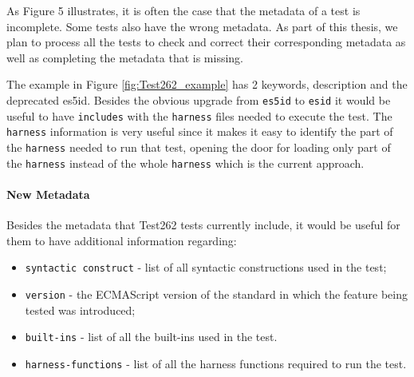\documentclass[runningheads]{llncs}
\begin{document}
As Figure 5 illustrates, it is often the case that the metadata of a test is incomplete. Some tests also have the wrong metadata. As part of this thesis, we plan to process all the tests to check and correct their corresponding metadata as well as completing the metadata that is missing.


The example in Figure \ref{fig:Test262_example} has 2 keywords, description and the deprecated es5id. Besides the obvious upgrade from \texttt{es5id} to \texttt{esid} it would be useful to have \texttt{includes} with the \texttt{harness} files needed to execute the test. The \texttt{harness} information is very useful since it makes it easy to identify the part of the \texttt{harness} needed to run that test, opening the door for loading only part of the \texttt{harness} instead of the whole \texttt{harness} which is the current approach.



\paragraph{New Metadata}
Besides the metadata that Test262 tests currently include, it would be useful for them to have additional information regarding:

\begin{itemize}
    \item \texttt{syntactic construct} - list of all syntactic constructions used in the test;
    \item \texttt{version} - the ECMAScript version of the standard in which the feature being tested was introduced;
    \item \texttt{built-ins} - list of all the built-ins used in the test.
    \item \texttt{harness-functions} - list of all the harness functions required to run the test.
\end{itemize}
\end{document}
